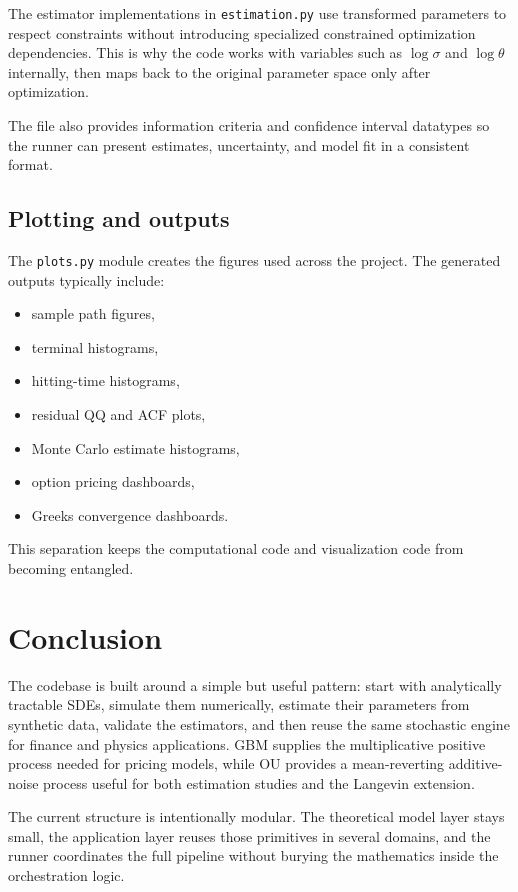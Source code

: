\documentclass[11pt]{article}
\begin{document}
The estimator implementations in \texttt{estimation.py} use transformed parameters to respect constraints without introducing specialized constrained optimization dependencies. This is why the code works with variables such as $\log\sigma$ and $\log\theta$ internally, then maps back to the original parameter space only after optimization.

The file also provides information criteria and confidence interval datatypes so the runner can present estimates, uncertainty, and model fit in a consistent format.

\subsection{Plotting and outputs}

The \texttt{plots.py} module creates the figures used across the project. The generated outputs typically include:
\begin{itemize}[leftmargin=1.2em]
  \item sample path figures,
  \item terminal histograms,
  \item hitting-time histograms,
  \item residual QQ and ACF plots,
  \item Monte Carlo estimate histograms,
  \item option pricing dashboards,
  \item Greeks convergence dashboards.
\end{itemize}

This separation keeps the computational code and visualization code from becoming entangled.

\section{Conclusion}

The codebase is built around a simple but useful pattern: start with analytically tractable SDEs, simulate them numerically, estimate their parameters from synthetic data, validate the estimators, and then reuse the same stochastic engine for finance and physics applications. GBM supplies the multiplicative positive process needed for pricing models, while OU provides a mean-reverting additive-noise process useful for both estimation studies and the Langevin extension.

The current structure is intentionally modular. The theoretical model layer stays small, the application layer reuses those primitives in several domains, and the runner coordinates the full pipeline without burying the mathematics inside the orchestration logic.
\end{document}
